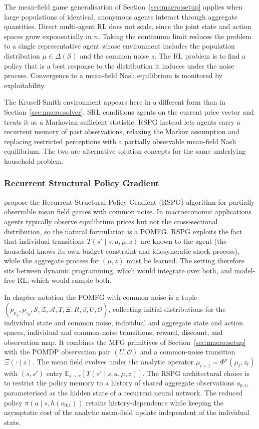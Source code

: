 The mean-field game generalisation of Section~\ref{sec:macro:setup}
applies when large populations of identical, anonymous agents
interact through aggregate quantities. Direct multi-agent RL does
not scale, since the joint state and action spaces grow exponentially
in $n$. Taking the continuum limit reduces the problem to a single
representative agent whose environment includes the population
distribution $\mu \in \Delta(\mathcal S)$ and the common noise $z$.
The RL problem is to find a policy that is a best response to the
distribution it induces under the noise process. Convergence to a
mean-field Nash equilibrium is monitored by exploitability.

The Krusell-Smith environment appears here in a different form
than in Section~\ref{sec:macro:solver}. SRL conditions agents on the
current price vector and treats it as a Markovian sufficient
statistic; RSPG instead lets agents carry a recurrent memory of past
observations, relaxing the Markov assumption and replacing restricted
perceptions with a partially observable mean-field Nash equilibrium.
The two are alternative solution concepts for the same underlying
household problem.

\subsubsection{Recurrent Structural Policy Gradient}
\label{sec:macro:rspg}

\citet{Wibault2026rspg} propose the Recurrent Structural Policy
Gradient (RSPG) algorithm for partially observable mean field games
with common noise. In macroeconomic applications agents typically
observe equilibrium prices but not the cross-sectional distribution,
so the natural formulation is a POMFG. RSPG exploits the fact that
individual transitions $T(s' \mid s, a, \mu, z)$ are known to the
agent (the household knows its own budget constraint and
idiosyncratic shock process), while the aggregate process for
$(\mu, z)$ must be learned. The setting therefore sits between
dynamic programming, which would integrate over both, and model-free
RL, which would sample both.

In chapter notation the POMFG with common noise is a tuple
$(p_{\mu_0}, p_{z_0}, \mathcal S, \mathcal Z, \mathcal A, T, \Xi, R,
\beta, U, \mathcal O)$, collecting initial distributions for the
individual state and common noise, individual and aggregate state
and action spaces, individual and common-noise transitions, reward,
discount, and observation map. It combines the MFG primitives of
Section~\ref{sec:macro:setup} with the POMDP observation pair
$(U, \mathcal O)$ and a common-noise transition $\Xi(\cdot \mid z)$.
The mean field evolves under the analytic operator
$\mu_{t+1} = \Phi^\pi(\mu_t, z_t)$ with $(s, s')$ entry
$\mathbb{E}_{a \sim \pi}[T(s' \mid s, a, \mu, z)]$. The RSPG
architectural choice is to restrict the policy memory to a history
of shared aggregate observations $o_{0:t}$, parameterised as the
hidden state of a recurrent neural network. The reduced policy
$\pi(a \mid s, h(o_{0:t}))$ retains history-dependence while keeping
the asymptotic cost of the analytic mean-field update independent of
the individual state.

